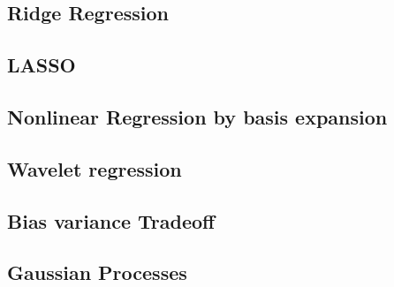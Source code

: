 \documentclass[MachineLearning]{subfiles}
\begin{document}
\subsection{Ridge Regression}
\subsection{LASSO}
\subsection{Nonlinear Regression by basis expansion}
\subsection{Wavelet regression}
\subsection{Bias variance Tradeoff}
\subsection{Gaussian Processes}
\end{document}
